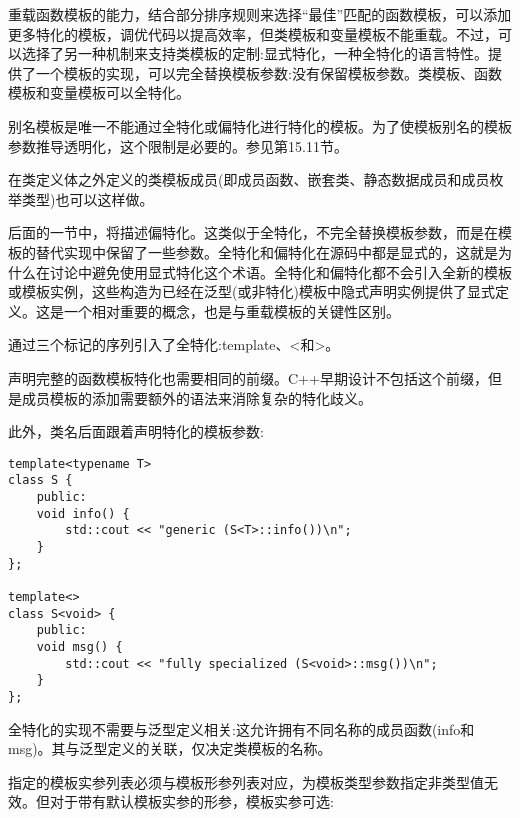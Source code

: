 
重载函数模板的能力，结合部分排序规则来选择“最佳”匹配的函数模板，可以添加更多特化的模板，调优代码以提高效率，但类模板和变量模板不能重载。不过，可以选择了另一种机制来支持类模板的定制:显式特化，一种全特化的语言特性。提供了一个模板的实现，可以完全替换模板参数:没有保留模板参数。类模板、函数模板和变量模板可以全特化。

\begin{tcolorbox}[colback=webgreen!5!white,colframe=webgreen!75!black]
\hspace*{0.75cm}别名模板是唯一不能通过全特化或偏特化进行特化的模板。为了使模板别名的模板参数推导透明化，这个限制是必要的。参见第15.11节。
\end{tcolorbox}

在类定义体之外定义的类模板成员(即成员函数、嵌套类、静态数据成员和成员枚举类型)也可以这样做。

后面的一节中，将描述偏特化。这类似于全特化，不完全替换模板参数，而是在模板的替代实现中保留了一些参数。全特化和偏特化在源码中都是显式的，这就是为什么在讨论中避免使用显式特化这个术语。全特化和偏特化都不会引入全新的模板或模板实例，这些构造为已经在泛型(或非特化)模板中隐式声明实例提供了显式定义。这是一个相对重要的概念，也是与重载模板的关键性区别。


通过三个标记的序列引入了全特化:template、<和>。

\begin{tcolorbox}[colback=webgreen!5!white,colframe=webgreen!75!black]
\hspace*{0.75cm}声明完整的函数模板特化也需要相同的前缀。C++早期设计不包括这个前缀，但是成员模板的添加需要额外的语法来消除复杂的特化歧义。
\end{tcolorbox}

此外，类名后面跟着声明特化的模板参数:

\begin{lstlisting}[style=styleCXX]
template<typename T>
class S {
	public:
	void info() {
		std::cout << "generic (S<T>::info())\n";
	}
};

template<>
class S<void> {
	public:
	void msg() {
		std::cout << "fully specialized (S<void>::msg())\n";
	}
};
\end{lstlisting}

全特化的实现不需要与泛型定义相关:这允许拥有不同名称的成员函数(info和msg)。其与泛型定义的关联，仅决定类模板的名称。

指定的模板实参列表必须与模板形参列表对应，为模板类型参数指定非类型值无效。但对于带有默认模板实参的形参，模板实参可选:

